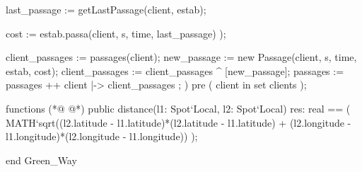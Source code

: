\begin{vdmpp}[breaklines=true]
    last_passage := getLastPassage(client, estab);
   
    cost := estab.passa(client, s, time, last_passage)
   );
   
  client_passages := passages(client);
  new_passage := new Passage(client, s, time, estab, cost);
  client_passages := client_passages ^ [new_passage];
  passages := passages ++ { client |-> client_passages };  
 )
 pre
 (
  client in set clients
 );
 
functions
(*@
\label{distance:259}
@*)
 public distance(l1: Spot`Local, l2: Spot`Local) res: real ==
    (
      MATH`sqrt((l2.latitude - l1.latitude)*(l2.latitude - l1.latitude) + (l2.longitude - l1.longitude)*(l2.longitude - l1.longitude))
    ); 
  
end Green_Way
\end{vdmpp}
